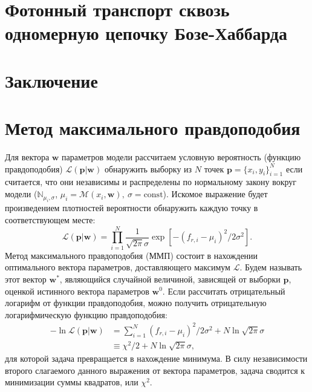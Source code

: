 \documentclass[14pt, a4paper]{extreport}
\renewcommand*\thesection{\arabic{section}}
\numberwithin{equation}{section}
\renewcommand*\thesection{\arabic{chapter}.\arabic{section}}
\begin{document}
\chapter{Фотонный транспорт сквозь одномерную цепочку Бозе-Хаббарда}

\chapter{Заключение}



\appendix
\renewcommand*\thesection{\Alph{chapter}.\arabic{section}}

\chapter{Метод максимального правдоподобия}\label{sec:MLE}

Для вектора $ \mathbf{w} $ параметров модели рассчитаем условную вероятность (функцию правдоподобия) $\mathcal{L}(\mathbf{p}|\mathbf{w})$ обнаружить выборку из $ N $ точек $\mathbf{p} = \{x_i, y_i\}_{i=1}^N$ если считается, что они независимы и распределены по нормальному закону вокруг модели ($\mathbb{N}_{\mu_i, \sigma}$, $\mu_i = \mathcal{M}(x_i, \mathbf{w}),\ \sigma = \text{const}$). Искомое выражение будет произведением плотностей вероятности обнаружить каждую точку в соответствующем месте:
\begin{equation}
\mathcal{L}(\mathbf{p}|\mathbf{w}) = \prod_{i=1}^{N} \frac{1}{\sqrt{2\pi}\sigma} \exp[ -(f_{r,i} - \mu_i)^2 / 2 \sigma^2].\label{eq:MLE} 
\end{equation}
Метод максимального правдоподобия (ММП) состоит в нахождении оптимального вектора параметров, доставляющего максимум $\mathcal{L}$. Будем называть этот вектор $ \mathbf{w}^*$, являющийся случайной величиной, зависящей от выборки $\mathbf{p}$, оценкой истинного вектора параметров $\mathbf{w}^0$. Если рассчитать отрицательный логарифм от функции правдоподобия, можно получить отрицательную логарифмическую функцию правдоподобия:
\begin{align*}
- \ln \mathcal{L}(\mathbf{p}|\mathbf{w}) &= \sum_{i=1}^N (f_{r,i} - \mu_i)^2 / 2 \sigma^2 + N \ln\sqrt{2\pi}\sigma
\label{eq:logL} \\
&\equiv \chi^2/2 + N\ln \sqrt{2\pi}\sigma,
\end{align*}
для которой задача превращается в нахождение минимума. В силу независимости второго слагаемого данного выражения от вектора параметров, задача сводится к минимизации суммы квадратов, или $\chi^2$.
\end{document}
